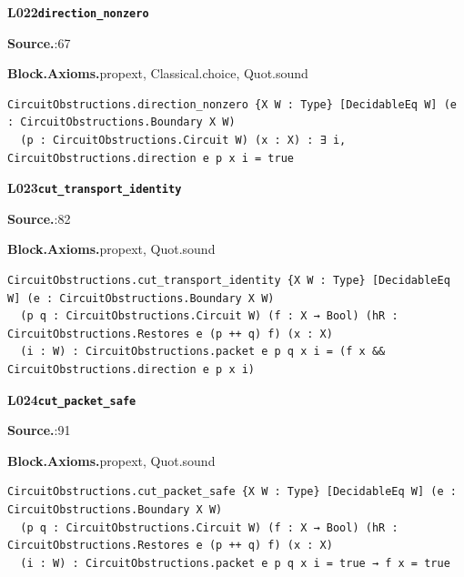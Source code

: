 \par\medskip\noindent\begin{minipage}{\textwidth}
{\small\bfseries L022\enspace\texttt{direction\_nonzero}\par}
{\footnotesize\raggedright\textbf{Source.}\enspace{}:67\par
\textbf{Block.}\quad\textbf{Axioms.}\enspace propext, Classical.choice, Quot.sound\par}\nopagebreak
\begin{lstlisting}
CircuitObstructions.direction_nonzero {X W : Type} [DecidableEq W] (e : CircuitObstructions.Boundary X W)
  (p : CircuitObstructions.Circuit W) (x : X) : ∃ i, CircuitObstructions.direction e p x i = true
\end{lstlisting}
\end{minipage}\par

\par\medskip\noindent\begin{minipage}{\textwidth}
{\small\bfseries L023\enspace\texttt{cut\_transport\_identity}\par}
{\footnotesize\raggedright\textbf{Source.}\enspace{}:82\par
\textbf{Block.}\quad\textbf{Axioms.}\enspace propext, Quot.sound\par}\nopagebreak
\begin{lstlisting}
CircuitObstructions.cut_transport_identity {X W : Type} [DecidableEq W] (e : CircuitObstructions.Boundary X W)
  (p q : CircuitObstructions.Circuit W) (f : X → Bool) (hR : CircuitObstructions.Restores e (p ++ q) f) (x : X)
  (i : W) : CircuitObstructions.packet e p q x i = (f x && CircuitObstructions.direction e p x i)
\end{lstlisting}
\end{minipage}\par

\par\medskip\noindent\begin{minipage}{\textwidth}
{\small\bfseries L024\enspace\texttt{cut\_packet\_safe}\par}
{\footnotesize\raggedright\textbf{Source.}\enspace{}:91\par
\textbf{Block.}\quad\textbf{Axioms.}\enspace propext, Quot.sound\par}\nopagebreak
\begin{lstlisting}
CircuitObstructions.cut_packet_safe {X W : Type} [DecidableEq W] (e : CircuitObstructions.Boundary X W)
  (p q : CircuitObstructions.Circuit W) (f : X → Bool) (hR : CircuitObstructions.Restores e (p ++ q) f) (x : X)
  (i : W) : CircuitObstructions.packet e p q x i = true → f x = true
\end{lstlisting}
\end{minipage}\par

